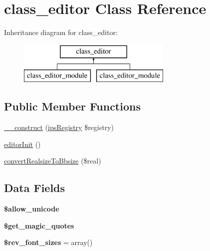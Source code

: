\hypertarget{classclass__editor}{\section{class\-\_\-editor Class Reference}
\label{classclass__editor}
}
Inheritance diagram for class\-\_\-editor\-:\begin{figure}[H]
\begin{center}
\leavevmode
\includegraphics[height=2.000000cm]{classclass__editor}
\end{center}
\end{figure}
\subsection*{Public Member Functions}
\begin{DoxyCompactItemize}
\item 
\hyperlink{classclass__editor_a178c3a93e57e75dd87a5d39112af0b07}{\-\_\-\-\_\-construct} (\hyperlink{classips_registry}{ips\-Registry} \$registry)
\item 
\hyperlink{classclass__editor_ac0609bdb87c6acf30d572bc8c9b6f792}{editor\-Init} ()
\item 
\hyperlink{classclass__editor_a4c390df3405c58d107d27d1414af5c2a}{convert\-Realsize\-To\-Bbsize} (\$real)
\end{DoxyCompactItemize}
\subsection*{Data Fields}
\begin{DoxyCompactItemize}
\item 
\hypertarget{classclass__editor_a7ac2970dd06938b0a8a8d828b53e25c0}{{\bfseries \$allow\-\_\-unicode}}\label{classclass__editor_a7ac2970dd06938b0a8a8d828b53e25c0}

\item 
\hypertarget{classclass__editor_a8f373f282006fcb9d5d2929d84b7891e}{{\bfseries \$get\-\_\-magic\-\_\-quotes}}\label{classclass__editor_a8f373f282006fcb9d5d2929d84b7891e}

\item 
\hypertarget{classclass__editor_a8a6ad668c5064a585c5d4eba06413fd0}{{\bfseries \$rev\-\_\-font\-\_\-sizes} = array()}\label{classclass__editor_a8a6ad668c5064a585c5d4eba06413fd0}

\end{DoxyCompactItemize}
